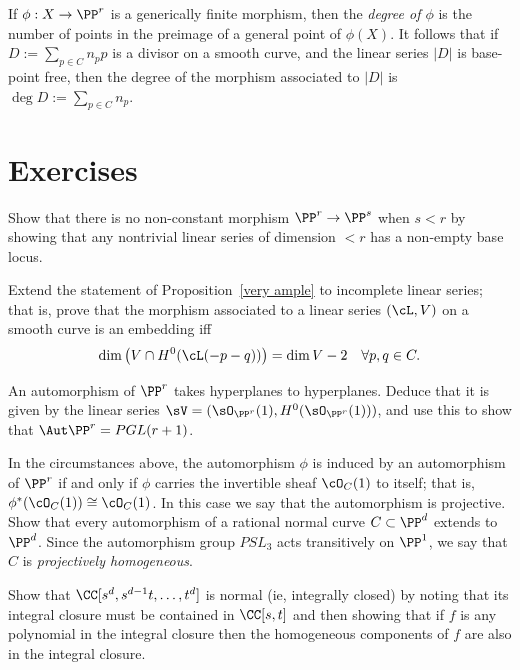 If $\phi:X \to \PP^r$ is a generically finite morphism, then the \emph{degree of $\phi$} is the number of points in the preimage of a general point of $\phi(X)$. It follows that if $D := \sum_{p\in C} n_pp$ is a divisor on a smooth curve, and the linear series $|D|$ is base-point free, then the degree of the morphism associated to $|D|$ is $\deg D := \sum_{p\in C} n_p$.

\section{Exercises}

\begin{exercise}\label{here there be basepoints}
 Show that there is no non-constant morphism $\PP^r\to \PP^s$ when $s<r$ by showing that any nontrivial linear
 series of dimension $<r$ has a non-empty base locus.
\end{exercise}

\begin{exercise}
Extend the statement of Proposition~\ref{very ample} to incomplete linear series; that is, prove that the morphism associated to a linear series $(\cL, V)$
on a smooth curve is an embedding iff
$$
\dim\big( V \cap H^0(\cL(-p-q))\big) = \dim V - 2 \quad \forall p, q \in C.
$$
\end{exercise}

\begin{exercise}\label{aut Pr}
An automorphism of $\PP^r$ takes hyperplanes to hyperplanes. Deduce that it is given by the linear series
$\sV = (\sO_{\PP^r}(1), H^0(\sO_{\PP^r}(1)))$, and use this to show that $\Aut \PP^r = PGL(r+1)$. 
\end{exercise}

\begin{exercise}\label{projective automorphism}
In the circumstances above, the automorphism $\phi$ is induced by an automorphism of $\PP^r$ if and only if $\phi$ carries the invertible sheaf $\cO_{C}(1)$ to itself; that is, $\phi^*(\cO_{C}(1)) \cong \cO_{C}(1)$. In this case we say that the automorphism
is projective. Show that every automorphism of a rational normal curve $C \subset \PP^d$  extends to $\PP^d$. Since the
automorphism group $PSL_3$ acts transitively on $\PP^1$, we say that
$C$ is \emph{projectively homogeneous}.


\end{exercise}

\begin{exercise}\label{normality of RNC}
 Show that $\CC[s^d,s^{d-1}t,\dots, t^d]$ is normal (ie, integrally closed) by noting that its integral closure must be
 contained in $\CC[s,t]$ and then showing that if $f$ is any polynomial
 in the integral closure then the homogeneous components of $f$ are also in the integral closure.
\end{exercise}



